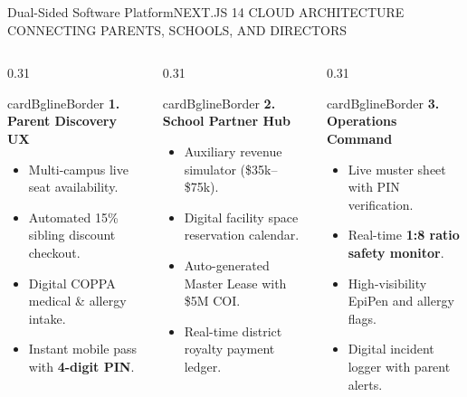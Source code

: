 \documentclass[aspectratio=169,9pt]{beamer}
\begin{document}
\begin{frame}{Dual-Sided Software Platform}{NEXT.JS 14 CLOUD ARCHITECTURE CONNECTING PARENTS, SCHOOLS, AND DIRECTORS}

\begin{columns}[T]
  \begin{column}{0.31\textwidth}
    \begin{execbox}{cardBg}{lineBorder}
      \textcolor{brandEmerald}{\textbf{\scriptsize 1. Parent Discovery UX}} \\[2pt]
      \tiny
      \begin{itemize}
        \item Multi-campus live seat availability.
        \item Automated 15\% sibling discount checkout.
        \item Digital COPPA medical \& allergy intake.
        \item Instant mobile pass with \textbf{4-digit PIN}.
      \end{itemize}
    \end{execbox}
  \end{column}

  \begin{column}{0.31\textwidth}
    \begin{execbox}{cardBg}{lineBorder}
      \textcolor{brandBlue}{\textbf{\scriptsize 2. School Partner Hub}} \\[2pt]
      \tiny
      \begin{itemize}
        \item Auxiliary revenue simulator (\$35k--\$75k).
        \item Digital facility space reservation calendar.
        \item Auto-generated Master Lease with \$5M COI.
        \item Real-time district royalty payment ledger.
      \end{itemize}
    \end{execbox}
  \end{column}

  \begin{column}{0.31\textwidth}
    \begin{execbox}{cardBg}{lineBorder}
      \textcolor{brandAmber}{\textbf{\scriptsize 3. Operations Command}} \\[2pt]
      \tiny
      \begin{itemize}
        \item Live muster sheet with PIN verification.
        \item Real-time \textbf{1:8 ratio safety monitor}.
        \item High-visibility EpiPen and allergy flags.
        \item Digital incident logger with parent alerts.
      \end{itemize}
    \end{execbox}
  \end{column}
\end{columns}


\end{frame}
\end{document}
